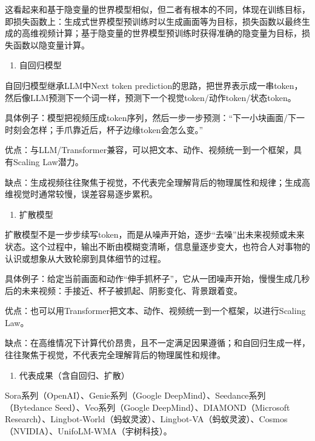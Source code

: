 这看起来和基于隐变量的世界模型相似，但二者有根本的不同，体现在训练目标，即损失函数上：生成式世界模型预训练时以生成画面等为目标，损失函数以最终生成的高维视频计算；基于隐变量的世界模型预训练时获得准确的隐变量为目标，损失函数以隐变量计算。

\begin{enumerate}
\def\labelenumi{\arabic{enumi}.}
\tightlist
\item
  自回归模型
\end{enumerate}

自回归模型继承LLM中Next token prediction的思路，把世界表示成一串token，然后像LLM预测下一个词一样，预测下一个视觉token/动作token/状态token。

具体例子：模型把视频压成token序列，然后一步一步预测：``下一小块画面/下一时刻会怎样；手爪靠近后，杯子边缘token会怎么变。''

优点：与LLM/Transformer兼容，可以把文本、动作、视频统一到一个框架，具有Scaling Law潜力。

缺点：生成视频往往聚焦于视觉，不代表完全理解背后的物理属性和规律；生成高维视觉时通常较慢，误差容易逐步累积。

\begin{enumerate}
\def\labelenumi{\arabic{enumi}.}
\setcounter{enumi}{1}
\tightlist
\item
  扩散模型
\end{enumerate}

扩散模型不是一步步续写token，而是从噪声开始，逐步``去噪''出未来视频或未来状态。这个过程中，输出不断由模糊变清晰，信息量逐步变大，也符合人对事物的认识或想象从大致轮廓到具体细节的过程。

具体例子：给定当前画面和动作``伸手抓杯子''，它从一团噪声开始，慢慢生成几秒后的未来视频：手接近、杯子被抓起、阴影变化、背景跟着变。

优点：也可以用Transformer把文本、动作、视频统一到一个框架，以进行Scaling Law。

缺点：在高维情况下计算代价昂贵，且不一定满足因果遵循；和自回归生成一样，往往聚焦于视觉，不代表完全理解背后的物理属性和规律。

\begin{enumerate}
\def\labelenumi{\arabic{enumi}.}
\setcounter{enumi}{2}
\tightlist
\item
  代表成果（含自回归、扩散）
\end{enumerate}

Sora系列（OpenAI）、Genie系列（Google DeepMind）、Seedance系列（Bytedance Seed）、Veo系列（Google DeepMind）、DIAMOND（Microsoft Research）、Lingbot-World（蚂蚁灵波）、Lingbot-VA（蚂蚁灵波）、Cosmos（NVIDIA）、UnifoLM-WMA（宇树科技）。

